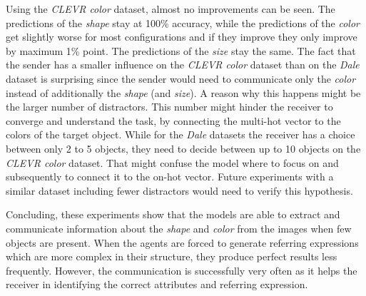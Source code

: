 Using the \emph{CLEVR color} dataset, almost no improvements can be seen.
The predictions of the \emph{shape} stay at 100\% accuracy, while the predictions of the \emph{color} get slightly worse for most configurations and if they improve they only improve by maximum 1\% point.
The predictions of the \emph{size} stay the same.
The fact that the sender has a smaller influence on the \emph{CLEVR color} dataset than on the \emph{Dale} dataset is surprising since the sender would need to communicate only the \emph{color} instead of additionally the \emph{shape} (and \emph{size}).
A reason why this happens might be the larger number of distractors.
This number might hinder the receiver to converge and understand the task, by connecting the multi-hot vector to the colors of the target object.
While for the \emph{Dale} datasets the receiver has a choice between only 2 to 5 objects, they need to decide between up to 10 objects on the \emph{CLEVR color} dataset.
That might confuse the model where to focus on and subsequently to connect it to the on-hot vector.
Future experiments with a similar dataset including fewer distractors would need to verify this hypothesis.

Concluding, these experiments show that the models are able to extract and communicate information about the \emph{shape} and \emph{color} from the images when few objects are present.
When the agents are forced to generate referring expressions which are more complex in their structure, they produce perfect results less frequently.
However, the communication is successfully very often as it helps the receiver in identifying the correct attributes and referring expression.
